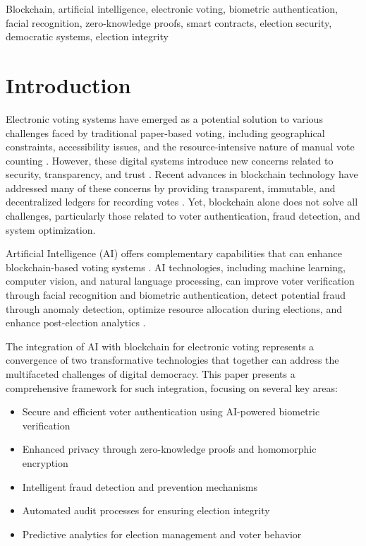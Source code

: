 \documentclass[conference]{IEEEtran}
\begin{document}
\begin{IEEEkeywords}
Blockchain, artificial intelligence, electronic voting, biometric authentication, facial recognition, zero-knowledge proofs, smart contracts, election security, democratic systems, election integrity
\end{IEEEkeywords}

\section{Introduction}
Electronic voting systems have emerged as a potential solution to various challenges faced by traditional paper-based voting, including geographical constraints, accessibility issues, and the resource-intensive nature of manual vote counting \cite{b1}. However, these digital systems introduce new concerns related to security, transparency, and trust \cite{b2}. Recent advances in blockchain technology have addressed many of these concerns by providing transparent, immutable, and decentralized ledgers for recording votes \cite{b3}. Yet, blockchain alone does not solve all challenges, particularly those related to voter authentication, fraud detection, and system optimization.

Artificial Intelligence (AI) offers complementary capabilities that can enhance blockchain-based voting systems \cite{b4}. AI technologies, including machine learning, computer vision, and natural language processing, can improve voter verification through facial recognition and biometric authentication, detect potential fraud through anomaly detection, optimize resource allocation during elections, and enhance post-election analytics \cite{b5}.

The integration of AI with blockchain for electronic voting represents a convergence of two transformative technologies that together can address the multifaceted challenges of digital democracy. This paper presents a comprehensive framework for such integration, focusing on several key areas:

\begin{itemize}
    \item Secure and efficient voter authentication using AI-powered biometric verification
    \item Enhanced privacy through zero-knowledge proofs and homomorphic encryption
    \item Intelligent fraud detection and prevention mechanisms
    \item Automated audit processes for ensuring election integrity
    \item Predictive analytics for election management and voter behavior
\end{itemize}
\end{document}
